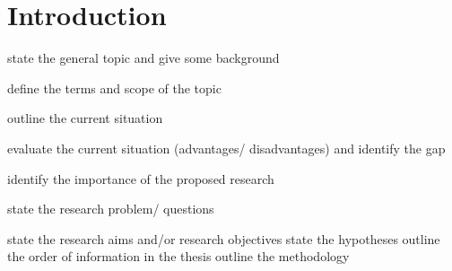 \chapter{Introduction}

    state the general topic and give some background
    

    define the terms and scope of the topic
    
    outline the current situation
    
    evaluate the current situation (advantages/ disadvantages) and identify the gap
    
    identify the importance of the proposed research
    
    state the research problem/ questions
    
    state the research aims and/or research objectives
    state the hypotheses
    outline the order of information in the thesis
    outline the methodology